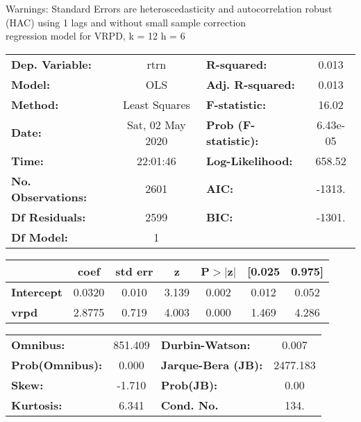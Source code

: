 Warnings: \newline
 [1] Standard Errors are heteroscedasticity and autocorrelation robust (HAC) using 1 lags and without small sample correction\\ 

regression model for VRPD, k = 12 h = 6\begin{center}
\begin{tabular}{lclc}
\toprule
\textbf{Dep. Variable:}    &       rtrn       & \textbf{  R-squared:         } &     0.013   \\
\textbf{Model:}            &       OLS        & \textbf{  Adj. R-squared:    } &     0.013   \\
\textbf{Method:}           &  Least Squares   & \textbf{  F-statistic:       } &     16.02   \\
\textbf{Date:}             & Sat, 02 May 2020 & \textbf{  Prob (F-statistic):} &  6.43e-05   \\
\textbf{Time:}             &     22:01:46     & \textbf{  Log-Likelihood:    } &    658.52   \\
\textbf{No. Observations:} &        2601      & \textbf{  AIC:               } &    -1313.   \\
\textbf{Df Residuals:}     &        2599      & \textbf{  BIC:               } &    -1301.   \\
\textbf{Df Model:}         &           1      & \textbf{                     } &             \\
\bottomrule
\end{tabular}
\begin{tabular}{lcccccc}
                   & \textbf{coef} & \textbf{std err} & \textbf{z} & \textbf{P$> |$z$|$} & \textbf{[0.025} & \textbf{0.975]}  \\
\midrule
\textbf{Intercept} &       0.0320  &        0.010     &     3.139  &         0.002        &        0.012    &        0.052     \\
\textbf{vrpd}      &       2.8775  &        0.719     &     4.003  &         0.000        &        1.469    &        4.286     \\
\bottomrule
\end{tabular}
\begin{tabular}{lclc}
\textbf{Omnibus:}       & 851.409 & \textbf{  Durbin-Watson:     } &    0.007  \\
\textbf{Prob(Omnibus):} &   0.000 & \textbf{  Jarque-Bera (JB):  } & 2477.183  \\
\textbf{Skew:}          &  -1.710 & \textbf{  Prob(JB):          } &     0.00  \\
\textbf{Kurtosis:}      &   6.341 & \textbf{  Cond. No.          } &     134.  \\
\bottomrule
\end{tabular}
\end{center}

